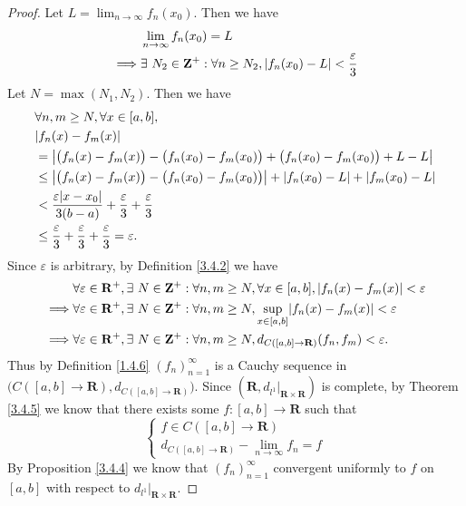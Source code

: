 \begin{proof}
    Let \(L = \lim_{n \to \infty} f_n(x_0)\).
    Then we have
    \begin{align*}
                 & \lim_{n \to \infty} f_n(x_0) = L                                                                \\
        \implies & \exists\ N_2 \in \mathbf{Z}^+ : \forall n \geq N_2, \abs*{f_n(x_0) - L} < \frac{\varepsilon}{3}
    \end{align*}
    Let \(N = \max(N_1, N_2)\).
    Then we have
    \begin{align*}
         & \forall n, m \geq N, \forall x \in [a, b],                                                                        \\
         & \abs*{f_n(x) - f_m(x)}                                                                                            \\
         & = \abs*{\big(f_n(x) - f_m(x)\big) - \big(f_n(x_0) - f_m(x_0)\big) + \big(f_n(x_0) - f_m(x_0)\big) + L - L}        \\
         & \leq \abs*{\big(f_n(x) - f_m(x)\big) - \big(f_n(x_0) - f_m(x_0)\big)} + \abs*{f_n(x_0) - L} + \abs*{f_m(x_0) - L} \\
         & < \frac{\varepsilon \abs*{x - x_0}}{3(b - a)} + \frac{\varepsilon}{3} + \frac{\varepsilon}{3}                     \\
         & \leq \frac{\varepsilon}{3} + \frac{\varepsilon}{3} + \frac{\varepsilon}{3} = \varepsilon.
    \end{align*}
    Since \(\varepsilon\) is arbitrary, by Definition \ref{3.4.2} we have
    \begin{align*}
                 & \forall \varepsilon \in \mathbf{R}^+, \exists\ N \in \mathbf{Z}^+ : \forall n, m \geq N, \forall x \in [a, b], \abs*{f_n(x) - f_m(x)} < \varepsilon \\
        \implies & \forall \varepsilon \in \mathbf{R}^+, \exists\ N \in \mathbf{Z}^+ : \forall n, m \geq N, \sup_{x \in [a, b]}\abs*{f_n(x) - f_m(x)} < \varepsilon    \\
        \implies & \forall \varepsilon \in \mathbf{R}^+, \exists\ N \in \mathbf{Z}^+ : \forall n, m \geq N, d_{C([a, b] \to \mathbf{R})}(f_n, f_m) < \varepsilon.
    \end{align*}
    Thus by Definition \ref{1.4.6} \((f_n)_{n = 1}^\infty\) is a Cauchy sequence in \(\big(C([a, b] \to \mathbf{R}), d_{C([a, b] \to \mathbf{R})}\big)\).
    Since \((\mathbf{R}, d_{l^1}|_{\mathbf{R} \times \mathbf{R}})\) is complete, by Theorem \ref{3.4.5} we know that there exists some \(f : [a, b] \to \mathbf{R}\) such that
    \[
        \begin{cases}
            f \in C([a, b] \to \mathbf{R}) \\
            d_{C([a, b] \to \mathbf{R})} - \lim_{n \to \infty} f_n = f
        \end{cases}
    \]
    By Proposition \ref{3.4.4} we know that \((f_n)_{n = 1}^\infty\) convergent uniformly to \(f\) on \([a, b]\) with respect to \(d_{l^1}|_{\mathbf{R} \times \mathbf{R}}\).


\end{proof}

